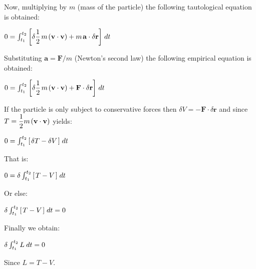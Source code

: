 \documentclass[10pt]{article}
\begin{document}
\newpage

\noindent Now, multiplying by $m$ (mass of the particle) the following tautological equation is obtained:
\par \bigskip \smallskip
\noindent $0 = \int_{t_1}^{t_2} \left[ \delta \dfrac{1}{2} \hspace{+0.12em} m \hspace{+0.12em} (\mathbf{v} \cdot \mathbf{v}) + m \hspace{+0.12em} \mathbf{a} \cdot \delta \mathbf{r} \right] \hspace{+0.12em} dt$
\par \bigskip \smallskip
\noindent Substituting $\mathbf{a}=\mathbf{F}/m$ (Newton's second law) the following empirical equation is obtained:
\par \bigskip \smallskip
\noindent $0 = \int_{t_1}^{t_2} \left[ \delta \dfrac{1}{2} \hspace{+0.12em} m \hspace{+0.12em} (\mathbf{v} \cdot \mathbf{v}) + \mathbf{F} \cdot \delta \mathbf{r} \right] \hspace{+0.12em} dt$
\par \bigskip \smallskip
\noindent If the particle is only subject to conservative forces then $\delta V = - \mathbf{F} \cdot \delta \mathbf{r}$ and since $T = \dfrac{1}{2} m \hspace{+0.12em} (\mathbf{v} \cdot \mathbf{v})$ yields:
\par \bigskip \smallskip
\noindent $0 = \int_{t_1}^{t_2} \left[ \hspace{+0.12em} \delta T - \delta V \hspace{+0.12em} \right] \hspace{+0.12em} dt$
\par \bigskip \smallskip
\noindent That is:
\par \bigskip \smallskip
\noindent $0 = \delta \int_{t_1}^{t_2} \left[ \hspace{+0.12em} T - V \hspace{+0.12em} \right] \hspace{+0.12em} dt$
\par \bigskip \smallskip
\noindent Or else:
\par \bigskip \smallskip
\noindent $\delta \int_{t_1}^{t_2} \left[ \hspace{+0.12em} T - V \hspace{+0.12em} \right] \hspace{+0.12em} dt = 0$
\par \bigskip \smallskip
\noindent Finally we obtain:
\par \bigskip \smallskip
\noindent $\delta \int_{t_1}^{t_2} L \hspace{+0.24em} dt = 0$
\par \bigskip \smallskip
\noindent Since $L= T - V$.
\end{document}
